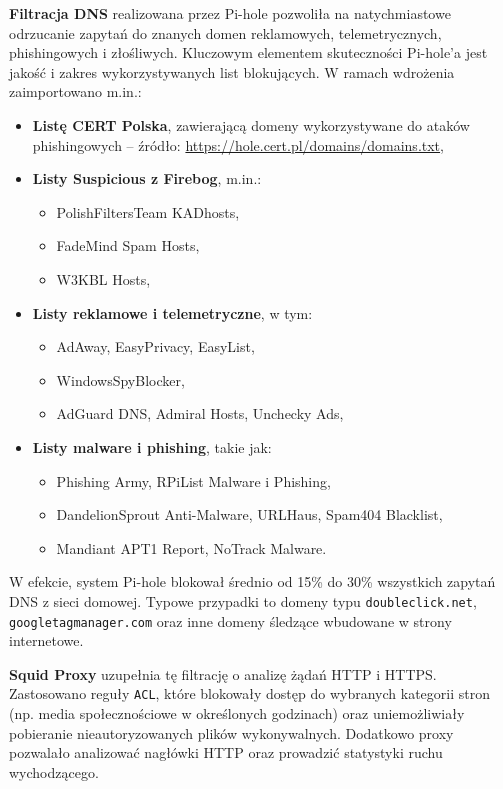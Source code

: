 \documentclass[
    left=2.5cm,         %
    right=2.5cm,        %
    top=2.5cm,          %
    bottom=3cm,         %
    bindingoffset=6mm,  %
    nohyphenation=true %
]{eiti/eiti-thesis} %
\begin{document}
\textbf{Filtracja DNS} realizowana przez Pi-hole pozwoliła na natychmiastowe odrzucanie zapytań do znanych domen reklamowych, telemetrycznych, phishingowych i złośliwych. Kluczowym elementem skuteczności Pi-hole’a jest jakość i zakres wykorzystywanych list blokujących. W ramach wdrożenia zaimportowano m.in.:
\begin{itemize}
    \item \textbf{Listę CERT Polska}\cite{cert_pl}, zawierającą domeny wykorzystywane do ataków phishingowych – źródło: \url{https://hole.cert.pl/domains/domains.txt},
    \item \textbf{Listy Suspicious z Firebog}, m.in.:
    \begin{itemize}
        \item PolishFiltersTeam KADhosts,
        \item FadeMind Spam Hosts,
        \item W3KBL Hosts,
    \end{itemize}
    \item \textbf{Listy reklamowe i telemetryczne}, w tym:
    \begin{itemize}
        \item AdAway, EasyPrivacy, EasyList,
        \item WindowsSpyBlocker,
        \item AdGuard DNS, Admiral Hosts, Unchecky Ads,
    \end{itemize}
    \item \textbf{Listy malware i phishing}, takie jak:
    \begin{itemize}
        \item Phishing Army, RPiList Malware i Phishing,
        \item DandelionSprout Anti-Malware, URLHaus, Spam404 Blacklist,
        \item Mandiant APT1 Report, NoTrack Malware.
    \end{itemize}
\end{itemize}

W efekcie, system Pi-hole blokował średnio od 15\% do 30\% wszystkich zapytań DNS z sieci domowej. Typowe przypadki to domeny typu \texttt{doubleclick.net}, \texttt{googletagmanager.com} oraz inne domeny śledzące wbudowane w strony internetowe.

\textbf{Squid Proxy} uzupełnia tę filtrację o analizę żądań HTTP i HTTPS. Zastosowano reguły \texttt{ACL}, które blokowały dostęp do wybranych kategorii stron (np. media społecznościowe w określonych godzinach) oraz uniemożliwiały pobieranie nieautoryzowanych plików wykonywalnych. Dodatkowo proxy pozwalało analizować nagłówki HTTP oraz prowadzić statystyki ruchu wychodzącego.
\end{document}
